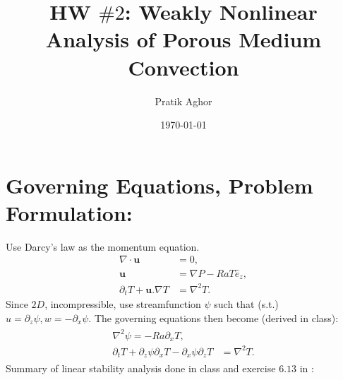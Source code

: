 \documentclass{article}
\author{Pratik Aghor}
\title{HW $\# 2$: Weakly Nonlinear Analysis of Porous Medium Convection}
\date{\today}  %
\newcommand{\grad}[1]{\nabla{#1}}
\newcommand{\deldot}[1]{\nabla \cdot{#1}}
\newcommand{\lap}[1]{\nabla^{2}{#1}}
\newcommand{\bsym}[1]{\boldsymbol{#1}}
\begin{document}
\maketitle
\section{Governing Equations, Problem Formulation:}
Use Darcy's law as the momentum equation. 
\begin{align}
    \deldot{\bsym{u}} &= 0, \\
    \bsym{u} &= \grad{P} - Ra T \hat{e}_{z},\\
    \partial_{t}T + \bsym{u}.\grad{T} &= \lap{T}.
\end{align}
Since $2D$, incompressible, use streamfunction $\psi$ such that (s.t.) $u = \partial_{z}\psi, w = -\partial_{x}\psi $. The governing equations then become (derived in class):
\begin{align}
 \begin{split}
  \lap{\psi} = - Ra \partial_{x} T, \\
  \partial_{t}T + \partial_{z}\psi \partial_{x}T - \partial_{x}\psi \partial_{z}T  &= \lap{T}.
 \end{split}
\end{align}
Summary of linear stability analysis done in class and exercise $6.13$ in \cite{drazin2002introduction}:
\end{document}
